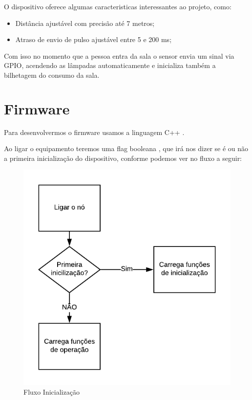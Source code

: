 \documentclass[openright]{normas-utf-tex} %
\begin{document}
O dispositivo oferece algumas caracteristicas interessantes ao projeto, como:

\begin{itemize}
    \item Distância ajustável com precisão até 7 metros;
    \item Atraso de envio de pulso ajustável entre 5 e 200 ms;
\end{itemize}

Com isso no momento que a pessoa entra da sala o sensor envia um sinal  via GPIO,  acendendo as lâmpadas automaticamente e inicializa também a bilhetagem do consumo da sala.

\section{Firmware}

Para desenvolvermos o firmware usamos a linguagem C++ \cite{Altabooks}. 

Ao ligar o equipamento teremos uma flag booleana \cite{Elsevier}, que irá nos dizer se é ou não a primeira inicialização do dispositivo, conforme podemos ver no fluxo a seguir:

\begin{figure}[!htb]
     \centering
     \includegraphics[scale=1]{Primeira_Inicializacao.png}
     \caption{Fluxo Inicialização}
     \label{}
\end{figure}
\end{document}
